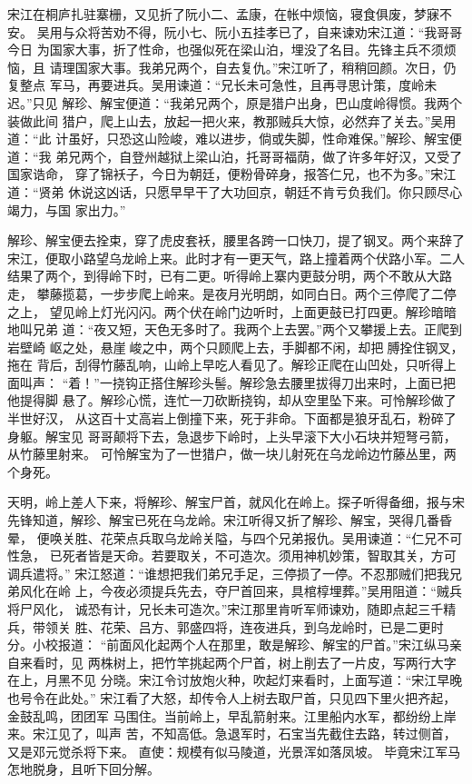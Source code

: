 宋江在桐庐扎驻寨栅，又见折了阮小二、孟康，在帐中烦恼，寝食俱废，梦寐不安。
吴用与众将苦劝不得，阮小七、阮小五挂孝已了，自来谏劝宋江道：“我哥哥今日
为国家大事，折了性命，也强似死在梁山泊，埋没了名目。先锋主兵不须烦恼，且
请理国家大事。我弟兄两个，自去复仇。”宋江听了，稍稍回颜。次日，仍复整点
军马，再要进兵。吴用谏道：“兄长未可急性，且再寻思计策，度岭未迟。”只见
解珍、解宝便道：“我弟兄两个，原是猎户出身，巴山度岭得惯。我两个装做此间
猎户，爬上山去，放起一把火来，教那贼兵大惊，必然弃了关去。”吴用道：“此
计虽好，只恐这山险峻，难以进步，倘或失脚，性命难保。”解珍、解宝便道：“我
弟兄两个，自登州越狱上梁山泊，托哥哥福荫，做了许多年好汉，又受了国家诰命，
穿了锦袄子，今日为朝廷，便粉骨碎身，报答仁兄，也不为多。”宋江道：“贤弟
休说这凶话，只愿早早干了大功回京，朝廷不肯亏负我们。你只顾尽心竭力，与国
家出力。”

解珍、解宝便去拴束，穿了虎皮套袄，腰里各跨一口快刀，提了钢叉。两个来辞了
宋江，便取小路望乌龙岭上来。此时才有一更天气，路上撞着两个伏路小军。二人
结果了两个，到得岭下时，已有二更。听得岭上寨内更鼓分明，两个不敢从大路走，
攀藤揽葛，一步步爬上岭来。是夜月光明朗，如同白日。两个三停爬了二停之上，
望见岭上灯光闪闪。两个伏在岭门边听时，上面更鼓已打四更。解珍暗暗地叫兄弟
道：“夜又短，天色无多时了。我两个上去罢。”两个又攀援上去。正爬到岩壁崎
岖之处，悬崖峻之中，两个只顾爬上去，手脚都不闲，却把膊拴住钢叉，拖在
背后，刮得竹藤乱响，山岭上早吃人看见了。解珍正爬在山凹处，只听得上面叫声：
“着！”一挠钩正搭住解珍头髻。解珍急去腰里拔得刀出来时，上面已把他提得脚
悬了。解珍心慌，连忙一刀砍断挠钩，却从空里坠下来。可怜解珍做了半世好汉，
从这百十丈高岩上倒撞下来，死于非命。下面都是狼牙乱石，粉碎了身躯。解宝见
哥哥颠将下去，急退步下岭时，上头早滚下大小石块并短弩弓箭，从竹藤里射来。
可怜解宝为了一世猎户，做一块儿射死在乌龙岭边竹藤丛里，两个身死。

天明，岭上差人下来，将解珍、解宝尸首，就风化在岭上。探子听得备细，报与宋
先锋知道，解珍、解宝已死在乌龙岭。宋江听得又折了解珍、解宝，哭得几番昏晕，
便唤关胜、花荣点兵取乌龙岭关隘，与四个兄弟报仇。吴用谏道：“仁兄不可性急，
已死者皆是天命。若要取关，不可造次。须用神机妙策，智取其关，方可调兵遣将。”
宋江怒道：“谁想把我们弟兄手足，三停损了一停。不忍那贼们把我兄弟风化在岭
上，今夜必须提兵先去，夺尸首回来，具棺椁埋葬。”吴用阻道：“贼兵将尸风化，
诚恐有计，兄长未可造次。”宋江那里肯听军师谏劝，随即点起三千精兵，带领关
胜、花荣、吕方、郭盛四将，连夜进兵，到乌龙岭时，已是二更时分。小校报道：
“前面风化起两个人在那里，敢是解珍、解宝的尸首。”宋江纵马亲自来看时，见
两株树上，把竹竿挑起两个尸首，树上削去了一片皮，写两行大字在上，月黑不见
分晓。宋江令讨放炮火种，吹起灯来看时，上面写道：“宋江早晚也号令在此处。”
宋江看了大怒，却传令人上树去取尸首，只见四下里火把齐起，金鼓乱鸣，团团军
马围住。当前岭上，早乱箭射来。江里船内水军，都纷纷上岸来。宋江见了，叫声
苦，不知高低。急退军时，石宝当先截住去路，转过侧首，又是邓元觉杀将下来。
直使：规模有似马陵道，光景浑如落凤坡。
毕竟宋江军马怎地脱身，且听下回分解。